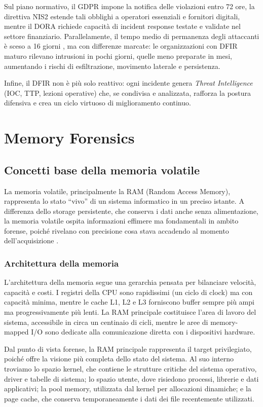 Sul piano normativo, il GDPR \cite{gdpr2016} impone la notifica delle violazioni entro 72 ore, la direttiva NIS2 \cite{nis2_2022} estende tali obblighi a operatori essenziali e fornitori digitali, mentre il DORA \cite{dora2022} richiede capacità di incident response testate e validate nel settore finanziario. Parallelamente, il tempo medio di permanenza degli attaccanti è sceso a 16 giorni \cite{mandiant2023}, ma con differenze marcate: le organizzazioni con DFIR maturo rilevano intrusioni in pochi giorni, quelle meno preparate in mesi, aumentando i rischi di esfiltrazione, movimento laterale e persistenza.

Infine, il DFIR non è più solo reattivo: ogni incidente genera \textit{Threat Intelligence} (IOC, TTP, lezioni operative) che, se condivisa e analizzata, rafforza la postura difensiva e crea un ciclo virtuoso di miglioramento continuo.


\section{Memory Forensics}

\subsection{Concetti base della memoria volatile}

La memoria volatile, principalmente la RAM (Random Access Memory), rappresenta lo stato “vivo” di un sistema informatico in un preciso istante. A differenza dello storage persistente, che conserva i dati anche senza alimentazione, la memoria volatile ospita informazioni effimere ma fondamentali in ambito forense, poiché rivelano con precisione cosa stava accadendo al momento dell’acquisizione \cite{ligh2014}.

\subsubsection{Architettura della memoria}
L’architettura della memoria segue una gerarchia pensata per bilanciare velocità, capacità e costi. I registri della CPU sono rapidissimi (un ciclo di clock) ma con capacità minima, mentre le cache L1, L2 e L3 forniscono buffer sempre più ampi ma progressivamente più lenti. La RAM principale costituisce l’area di lavoro del sistema, accessibile in circa un centinaio di cicli, mentre le aree di memory-mapped I/O sono dedicate alla comunicazione diretta con i dispositivi hardware.

Dal punto di vista forense, la RAM principale rappresenta il target privilegiato, poiché offre la visione più completa dello stato del sistema. Al suo interno troviamo lo spazio kernel, che contiene le strutture critiche del sistema operativo, driver e tabelle di sistema; lo spazio utente, dove risiedono processi, librerie e dati applicativi; la pool memory, utilizzata dal kernel per allocazioni dinamiche; e la page cache, che conserva temporaneamente i dati dei file recentemente utilizzati.

